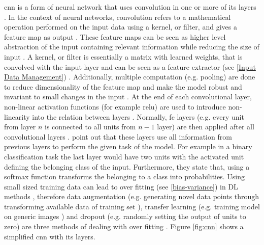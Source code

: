 



\gls{cnn} \autocite{lecun1989backpropagation} is a form of neural network that uses convolution in one or more of its layers \autocite{deeplearningav}. In the context of neural networks, convolution refers to a mathematical operation performed on the input data using a kernel, or filter, and gives a feature map as output \autocite{deeplearningav}. These feature maps can be seen as higher level abstraction of the input \autocite{szeEfficientProcessingDeep2017} containing relevant information while reducing the size of input \autocite{deeplearningav}. A kernel, or filter is essentially a matrix with learned weights, that is convolved with the input layer and can be seen as a feature extractor (see \ref{Input Data Management}) \autocite{wensup}. Additionally, multiple computation (e.g. pooling) are done to reduce dimensionality of the feature map and make the model robust and invariant to small changes in the input \autocite{szeEfficientProcessingDeep2017}. At the end of each convolutional layer, non-linear activation functions (for example \gls{relu}) are used to introduce non-linearity into the relation between layers \autocite{szeEfficientProcessingDeep2017}. Normally, \gls{fc} layers (e.g. every unit from layer $n$ is connected to all units from $n-1$ layer) are then applied after all convolutional layers \autocite{szeEfficientProcessingDeep2017}. \textcite{wensup} point out that these layers use all information from previous layers to perform the given task of the model. For example in a binary classification task the last layer would have two units with the activated unit defining the belonging class of the input. Furthermore, they state that, using a softmax function transforms the belonging to a class into probabilities. 
Using small sized training data can lead to over fitting (see \ref{bias-variance}) in \gls{DL} methods \autocite{deeplearningav}, therefore data augmentation (e.g. generating novel data points through transforming available data of training set \autocite{perez2017effectiveness}), transfer learning (e.g. training model on generic images \autocite{nanniComparisonTransferLearning2020}) and dropout (e.g. randomly setting the output of units to zero) are three methods of dealing with over fitting \autocite{wensup}. Figure \ref{fig:cnn} shows a simplified \gls{cnn} with its layers. 

